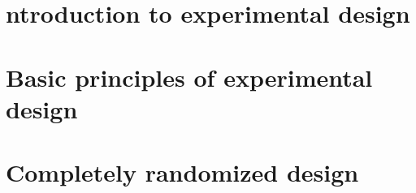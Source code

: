 \documentclass[]{book}
\begin{document}
\hypertarget{ntroduction-to-experimental-design}{%
\section{ntroduction to experimental design}\label{ntroduction-to-experimental-design}}

\hypertarget{basic-principles-of-experimental-design}{%
\section{Basic principles of experimental design}\label{basic-principles-of-experimental-design}}

\hypertarget{completely-randomized-design}{%
\section{Completely randomized design}\label{completely-randomized-design}}


\end{document}
